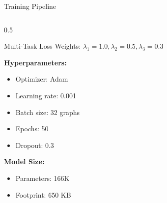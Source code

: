 \documentclass[aspectratio=169]{beamer}
\begin{document}
\begin{frame}{Training Pipeline}
\begin{columns}
\begin{column}{0.5\textwidth}
\begin{block}{Multi-Task Loss}
                Weights: $\lambda_1=1.0, \lambda_2=0.5, \lambda_3=0.3$
            \end{block}
            
            \vspace{0.2cm}
            
            \textbf{Hyperparameters:}
            \begin{itemize}
                \item Optimizer: Adam
                \item Learning rate: 0.001
                \item Batch size: 32 graphs
                \item Epochs: 50
                \item Dropout: 0.3
            \end{itemize}
            
            \vspace{0.2cm}
            
            \textbf{Model Size:}
            \begin{itemize}
                \item Parameters: 166K
                \item Footprint: 650 KB
            \end{itemize}
        \end{column}
    \end{columns}
\end{frame}
\end{document}
